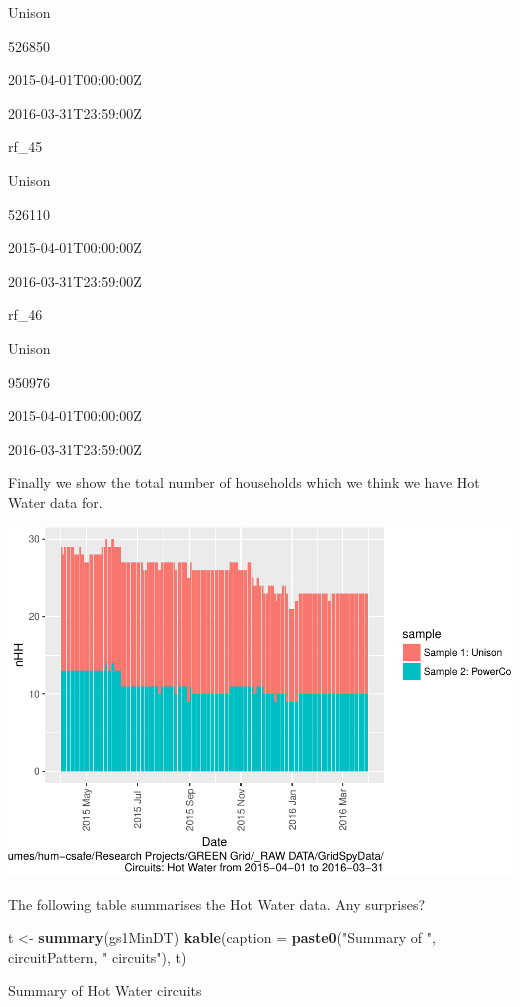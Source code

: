 \documentclass[]{article}
\newenvironment{Shaded}{\begin{snugshade}}{\end{snugshade}}
\newcommand{\KeywordTok}[1]{\textcolor[rgb]{0.13,0.29,0.53}{\textbf{#1}}}
\newcommand{\DataTypeTok}[1]{\textcolor[rgb]{0.13,0.29,0.53}{#1}}
\newcommand{\StringTok}[1]{\textcolor[rgb]{0.31,0.60,0.02}{#1}}
\newcommand{\NormalTok}[1]{#1}
\begin{document}
Unison

526850

2015-04-01T00:00:00Z

2016-03-31T23:59:00Z

rf\_45

Unison

526110

2015-04-01T00:00:00Z

2016-03-31T23:59:00Z

rf\_46

Unison

950976

2015-04-01T00:00:00Z

2016-03-31T23:59:00Z

Finally we show the total number of households which we think we have
Hot Water data for.

\includegraphics{nzGGHouseholdPowerDemandProfile_Hot Water_2015-04-01_2016-03-31_files/figure-latex/liveDataHouseholds-1.pdf}

The following table summarises the Hot Water data. Any surprises?

\begin{Shaded}
\begin{Highlighting}[]
\NormalTok{t <-}\StringTok{ }\KeywordTok{summary}\NormalTok{(gs1MinDT)}
\KeywordTok{kable}\NormalTok{(}\DataTypeTok{caption =} \KeywordTok{paste0}\NormalTok{(}\StringTok{"Summary of "}\NormalTok{, circuitPattern, }\StringTok{" circuits"}\NormalTok{), t)}
\end{Highlighting}
\end{Shaded}

Summary of Hot Water circuits
\end{document}
